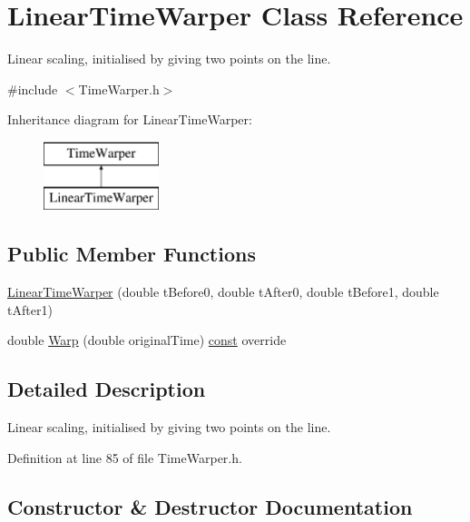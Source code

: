 \hypertarget{class_linear_time_warper}{}\section{Linear\+Time\+Warper Class Reference}
\label{class_linear_time_warper}


Linear scaling, initialised by giving two points on the line.  




{\ttfamily \#include $<$Time\+Warper.\+h$>$}

Inheritance diagram for Linear\+Time\+Warper\+:\begin{figure}[H]
\begin{center}
\leavevmode
\includegraphics[height=2.000000cm]{class_linear_time_warper}
\end{center}
\end{figure}
\subsection*{Public Member Functions}
\begin{DoxyCompactItemize}
\item 
\hyperlink{class_linear_time_warper_a4771fb9688607d0575f1fb889559120c}{Linear\+Time\+Warper} (double t\+Before0, double t\+After0, double t\+Before1, double t\+After1)
\item 
double \hyperlink{class_linear_time_warper_aef575f23fda617c30721ff2fdb2a2f37}{Warp} (double original\+Time) \hyperlink{getopt1_8c_a2c212835823e3c54a8ab6d95c652660e}{const}  override
\end{DoxyCompactItemize}


\subsection{Detailed Description}
Linear scaling, initialised by giving two points on the line. 

Definition at line 85 of file Time\+Warper.\+h.



\subsection{Constructor \& Destructor Documentation}
